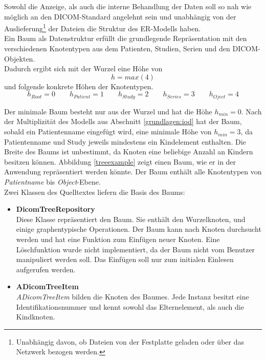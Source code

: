 Sowohl die Anzeige, als auch die interne Behandlung der Daten soll so nah wie möglich an den DICOM-Standard angelehnt sein und unabhängig von der Auslieferung\footnote{Unabhängig davon, ob Dateien von der Festplatte geladen oder über das Netzwerk bezogen werden.} der Dateien die Struktur des ER-Modells haben.\\
Ein Baum als Datenstruktur erfüllt die grundlegende Repräsentation mit den verschiedenen Knotentypen aus dem Patienten, Studien, Serien und den DICOM-Objekten.\\
Dadurch ergibt sich mit der Wurzel eine Höhe von
\begin{equation}
h = max(4)
\label{baumheight}
\end{equation}
und folgende konkrete Höhen der Knotentypen.
\begin{equation}
h_{Root} = 0 \qquad
h_{Patient} = 1 \qquad 
h_{Study} = 2 \qquad
h_{Series} = 3 \qquad
h_{Oject} = 4
\label{heights}
\end{equation}

Der minimale Baum besteht nur aus der Wurzel und hat die Höhe $h_{min} = 0$. Nach der Multiplizität des Modells aus Abschnitt \ref{grundlagen:iod} hat der Baum, sobald ein Patientenname eingefügt wird, eine minimale Höhe von $h_{min} = 3$, da Patientenname und Study jeweils mindestens ein Kindelement enthalten. Die Breite des Baums ist unbestimmt, da Knoten eine beliebige Anzahl an Kindern besitzen können. Abbildung \ref{treeexample} zeigt einen Baum, wie er in der Anwendung repräsentiert werden könnte. Der Baum enthält alle Knotentypen von \textit{Patientname} bis \textit{Object}-Ebene.\\
Zwei Klassen des Quelltextes liefern die Basis des Baums:

\begin{itemize}
\item \textbf{DicomTreeRepository}\\
	  Diese Klasse repräsentiert den Baum. Sie enthält den Wurzelknoten, und einige graphentypische Operationen. Der Baum kann nach Knoten durchsucht werden und hat eine Funktion zum Einfügen neuer Knoten. Eine Löschfunktion wurde nicht implementiert, da der Baum nicht vom Benutzer manipuliert werden soll. Das Einfügen soll nur zum initialen Einlesen aufgerufen werden.
\item \textbf{ADicomTreeItem}\\
	  \textit{ADicomTreeItem} bilden die Knoten des Baumes. Jede Instanz besitzt eine Identifikationsnummer und kennt sowohl das Elternelement, als auch die Kindknoten. 
\end{itemize}

